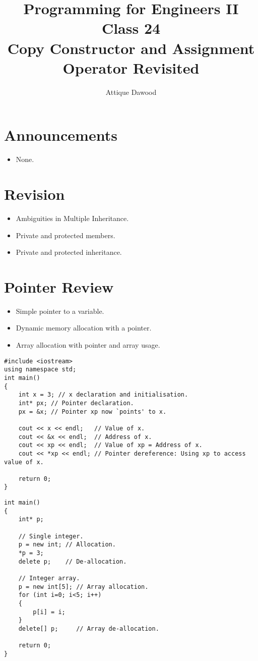\documentclass[12pt,a4paper]{article}
\title{\vspace{-2cm}Programming for Engineers II\\Class 24\\Copy Constructor and Assignment Operator Revisited}
\author{Attique Dawood}
\begin{document}
\maketitle
\section{Announcements}
\begin{itemize}
\item None.
\end{itemize}
\section{Revision}
\begin{itemize}
\item Ambiguities in Multiple Inheritance.
\item Private and protected members.
\item Private and protected inheritance.
\end{itemize}
\section{Pointer Review}
\begin{itemize}
\item Simple pointer to a variable.
\item Dynamic memory allocation with a pointer.
\item Array allocation with pointer and array usage.
\end{itemize}
\begin{lstlisting}[caption={Pointer Basics}]
#include <iostream>
using namespace std;
int main()
{
	int x = 3; // x declaration and initialisation.
	int* px; // Pointer declaration.
	px = &x; // Pointer xp now `points' to x.
	
	cout << x << endl;   // Value of x.
	cout << &x << endl;  // Address of x.
	cout << xp << endl;  // Value of xp = Address of x.
	cout << *xp << endl; // Pointer dereference: Using xp to access value of x.
	
	return 0;
}
\end{lstlisting}
\begin{lstlisting}[caption={Dynamic memory allocation with pointer}]
int main()
{
	int* p;
	
	// Single integer.
	p = new int; // Allocation.
	*p = 3;
	delete p;    // De-allocation.
	
	// Integer array.
	p = new int[5]; // Array allocation.
	for (int i=0; i<5; i++)
	{
		p[i] = i;
	}		
	delete[] p;     // Array de-allocation.
	
	return 0;
}
\end{lstlisting}
\end{document}
